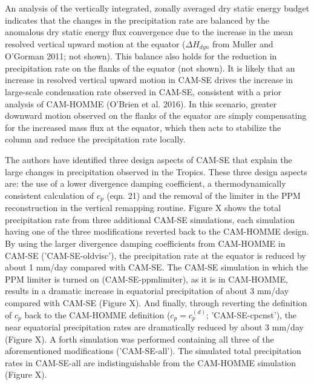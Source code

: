 An analysis of the vertically integrated, zonally averaged dry static energy budget indicates that the changes in the precipitation rate are balanced by the anomalous dry static energy flux convergence due to the increase in the mean resolved vertical upward motion at the equator ($\Delta{H_{dyn}}$ from Muller and O'Gorman 2011; not shown). This balance also holds for the reduction in precipitation rate on the flanks of the equator (not shown). It is likely that an increase in resolved vertical upward motion in CAM-SE drives the increase in large-scale condensation rate observed in CAM-SE, consistent with a prior analysis of CAM-HOMME (O'Brien et al. 2016). In this scenario, greater downward motion observed on the flanks of the equator are simply compensating for the increased mass flux at the equator, which then acts to stabilize the column and reduce the precipitation rate locally.

The authors have identified three design aspects of CAM-SE that explain the large changes in precipitation observed in the Tropics. These three design aspects are: the use of a lower divergence damping coefficient, a thermodynamically consistent calculation of $c_p$ (eqn. 21) and the removal of the limiter in the PPM reconstruction in the vertical remapping routine. Figure X shows the total precipitation rate from three additional CAM-SE simulations, each simulation having one of the three modifications reverted back to the CAM-HOMME design. By using the larger divergence damping coefficients from CAM-HOMME in CAM-SE ('CAM-SE-oldvisc'), the precipitation rate at the equator is reduced by about 1 mm/day compared with CAM-SE. The CAM-SE simulation in which the PPM limiter is turned on (CAM-SE-ppmlimiter), as it is in CAM-HOMME, results in a dramatic increase in equatorial precipitation of about 3 mm/day compared with CAM-SE (Figure X). And finally, through reverting the definition of $c_p$ back to the CAM-HOMME definition ($c_p = c_p^{(d)}$; 'CAM-SE-cpcnst'), the near equatorial precipitation rates are dramatically reduced by about 3 mm/day (Figure X). A forth simulation was performed containing all three of the aforementioned modifications ('CAM-SE-all'). The simulated total precipitation rates in CAM-SE-all are indistinguishable from the CAM-HOMME simulation (Figure X).  

